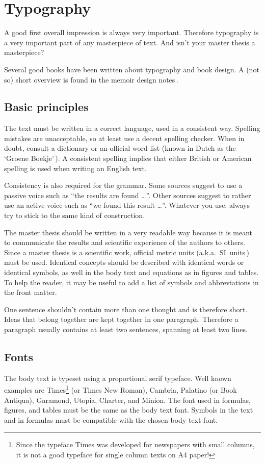 \documentclass[11pt,article,oneside,a4paper]{memoir}
\newcommand\Dutch[1]{`\foreignlanguage{dutch}{#1}'}
\begin{document}
\chapter{Typography}
A good first overall impression is always very important. Therefore
typography is a very important part of any masterpiece of text. And isn't
your master thesis a masterpiece?

Several good books have been written about typography and book design. A
(not so) short overview is found in the memoir design notes\,\cite{memdesign}.

\section{Basic principles}
The text must be written in a correct language, used in a consistent way.
Spelling mistakes are unacceptable, so at least use a decent spelling
checker. When in doubt, consult a dictionary or an official word list
(known in Dutch as the \Dutch{Groene Boekje}\,\cite{grboek}). A consistent
spelling implies that either British or American spelling is used when
writing an English text.

Consistency is also required for the grammar. Some sources suggest to use a
passive voice such as ``the results are found \ldots''. Other sources
suggest to rather use an active voice such as ``we found this result
\ldots''. Whatever you use, always try to stick to the same kind of
construction.

The master thesis should be written in a very readable way because it is
meant to communicate the results and scientific experience of the authors
to others.
Since a master thesis is a scientific work, official metric units (a.k.a.\
SI~units\,\cite{siunits}) must be used.
Identical concepts should be described with identical words or identical
symbols, as well in the body text and equations as in figures and tables.
To help the reader, it may be useful to add a list of symbols and
abbreviations in the front matter.

One sentence shouldn't contain more than one thought and is
therefore short. Ideas that belong together are kept together in one
paragraph. Therefore a paragraph usually contains at least two sentences,
spanning at least two lines.

\section{Fonts}
The body text is typeset using a proportional serif typeface. Well known
examples are Times\footnote{Since the typeface Times was developed for
  newspapers with small columns, it is not a good typeface for single
  column texts on A4 paper!} (or Times New Roman), Cambria, Palatino (or
Book Antiqua), Garamond, Utopia, Charter, and Minion. The font used in
formulas, figures, and tables must be the same as the body text font.
Symbols in the text and in formulas must be compatible with the chosen body
text font.
\end{document}
